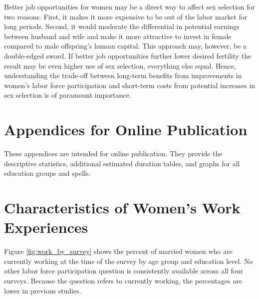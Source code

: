 \documentclass[12pt,letterpaper]{article}
\begin{document}
Better job opportunities for women may be a direct way to affect sex selection for two 
reasons.
First, it makes it more expensive to be out of the labor market for long periods.
Second, it would moderate the differential in potential earnings between husband and
wife and make it more attractive to invest in female compared to male offspring's human 
capital.
This approach may, however, be a double-edged sword.
If better job opportunities further lower desired fertility the result may be even
higher use of sex selection, everything else equal.
Hence, understanding the trade-off between long-term benefits from improvements in 
women's labor force participation and short-term costs from potential increases in sex 
selection is of paramount importance.




\clearpage

\onehalfspacing






\clearpage
\newpage

\appendix

\renewcommand\thefigure{\thesection.\arabic{figure}}    
\renewcommand\thetable{\thesection.\arabic{table}}    

\section*{Appendices for Online Publication}

These appendices are intended for online publication.
They provide the descriptive statistics, additional
estimated duration tables, and graphs for all 
education groups and spells.

\clearpage
\newpage

\section{Characteristics of Women's Work Experiences}

\setcounter{figure}{0}
\setcounter{table}{0}

Figure \ref{fig:work_by_survey} shows the percent of married women who are 
currently working at the time of the survey by age group and education level.
No other labor force participation question is consistently available across all 
four surveys. 
Because the question refers to currently working, the percentages are lower in previous
studies. 
\end{document}
